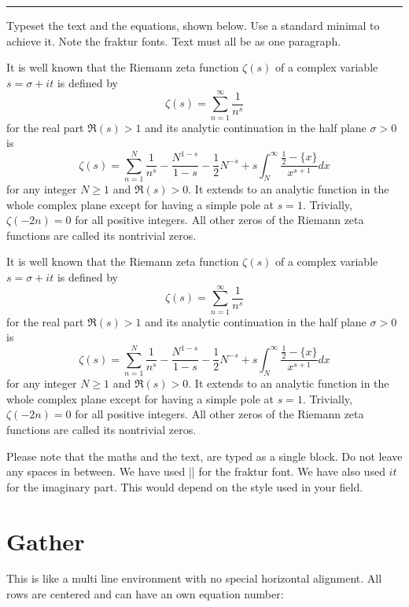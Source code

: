 {\hrule

\clearpage


\begin{casestudy}{%
Typeset the text and the equations, shown below. Use a standard minimal to achieve it. Note the fraktur fonts. Text must all be as one paragraph.}

It is well known that the Riemann zeta function $\zeta(s)$ of a complex variable $s=\sigma+it$ is defined by
\[
\zeta(s)=\sum_{n=1}^{\infty}\frac{1}{n^{s}}
\]
for the real part $\mathfrak{R}(s)>1$ and its analytic continuation in the half plane $\sigma>0$ is
\begin{equation}\label{func:zeta}
\zeta(s)=\sum_{n=1}^{N}\frac{1}{n^{s}}-\frac{N^{1-s}}{1-s}-\frac{1}{2}N^{-s}
+s\int_{N}^{\infty}\frac{\frac{1}{2}-\{x\}}{x^{s+1}}dx
\end{equation}
for any integer $N\geq1$ and $\mathfrak{R}(s)>0$.
It extends to an analytic function in the whole complex plane except for having a simple pole at $s=1$. Trivially, $\zeta(-2n)=0$ for all positive integers. All other zeros of the Riemann zeta functions are called its nontrivial zeros.
\bottomline

\begin{teX}
It is well known that the Riemann zeta function $\zeta(s)$ of a complex variable $s=\sigma+it$ is defined by
\[
\zeta(s)=\sum_{n=1}^{\infty}\frac{1}{n^{s}}
\]
for the real part $\mathfrak{R}(s)>1$ and its analytic continuation in the half plane $\sigma>0$ is
\begin{equation}\label{func:zeta}
\zeta(s)=\sum_{n=1}^{N}\frac{1}{n^{s}}-\frac{N^{1-s}}{1-s}-\frac{1}{2}N^{-s}
+s\int_{N}^{\infty}\frac{\frac{1}{2}-\{x\}}{x^{s+1}}dx
\end{equation}
for any integer $N\geq1$ and $\mathfrak{R}(s)>0$.
It extends to an analytic function in the whole complex plane except for having a simple pole at $s=1$. Trivially, $\zeta(-2n)=0$ for all positive integers. All other zeros of the Riemann zeta functions are called its nontrivial zeros.
\end{teX}

Please note that the maths and the text, are typed as a single block. Do not leave any spaces in between. We have used |\mathfrak| for the fraktur font. We have also used $it$ for the imaginary part. This would depend on the style used in your field. 
\end{casestudy}

\clearpage
\section{Gather}
This is like a multi line environment with no special horizontal alignment. All rows
are centered and can have an own equation number:

}
